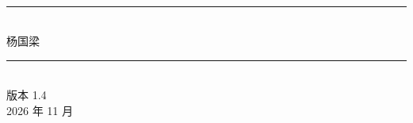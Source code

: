 \begin{titlepage}
    \thispagestyle{empty}
    \begin{center}
    \vspace*{2cm}
    {\Huge\bfseries\color{blue!50!black} \bookname}\\[0.6cm]
    \rule{\linewidth}{0.6pt}\\[1cm]
    {\Large 杨国梁}\\[1cm]
    \rule{\linewidth}{0.6pt}\\[2cm]
    \vfill
    {\large 版本 1.4}\\[0.3cm]
    {\large 2026 年 11 月}\\[0.5cm]
    \end{center}
\end{titlepage}
\addtocounter{page}{1}
\cleardoublepage
\frontmatter
